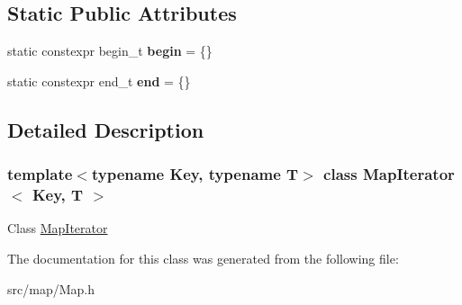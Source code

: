 \subsection*{Static Public Attributes}
\begin{DoxyCompactItemize}
\item 
\mbox{\label{classMapIterator_a4ce43a10c73bb98307d40f6afcbf101c}} 
static constexpr begin\+\_\+t {\bfseries begin} = \{\}
\item 
\mbox{\label{classMapIterator_a00c4e49846b05c748ed93575610c79b0}} 
static constexpr end\+\_\+t {\bfseries end} = \{\}
\end{DoxyCompactItemize}


\subsection{Detailed Description}
\subsubsection*{template$<$typename Key, typename T$>$\newline
class Map\+Iterator$<$ Key, T $>$}

Class \hyperlink{classMapIterator}{Map\+Iterator} 

The documentation for this class was generated from the following file\+:\begin{DoxyCompactItemize}
\item 
src/map/Map.\+h\end{DoxyCompactItemize}
